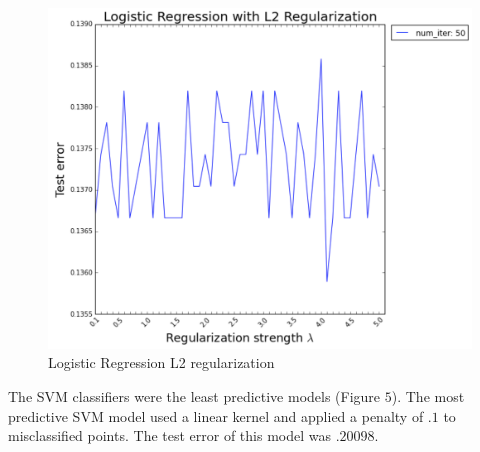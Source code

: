 \documentclass[11pt, oneside]{article}   	%
\begin{document}
\begin{figure}[H]
\caption{Logistic Regression L2 regularization}
\begin{center}
  \includegraphics[scale=.4]{logistic_regression_l2}
\end{center}
\end{figure}


The SVM classifiers were the least predictive models (Figure $5$). The most predictive SVM model used a linear kernel and applied a penalty of $.1$ to misclassified points. The test error of this model was $.20098$.
\end{document}
